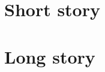 \documentclass[a4paper]{article}
\begin{document}
\section{Short story}

\section{Long story}

\end{document}

